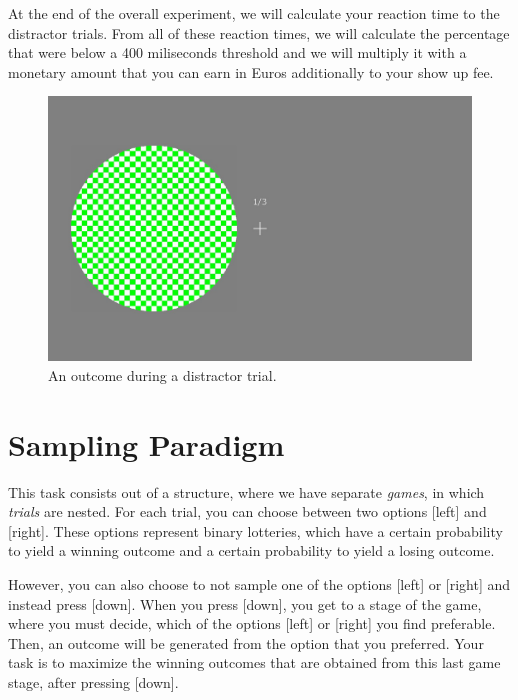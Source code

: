\documentclass[12pt, oneside]{scrartcl}
\begin{document}
At the end of the overall experiment, we will calculate your reaction time to the distractor trials. From all of these reaction times, we will calculate the percentage that were below a 400 miliseconds threshold and we will multiply it with a monetary amount that you can earn in Euros additionally to your show up fee. \vspace{\baselineskip}


\begin{figure}[h!]
\begin{center}
\includegraphics[scale=0.2]{distrLeft.jpg}
\caption{An outcome during a distractor trial.}
\label{distrLeft}
\end{center}
\end{figure}



\pagebreak
\section{Sampling Paradigm}

This task consists out of a structure, where we have separate \textit{games}, in which \textit{trials} are nested. For each trial, you can choose between two options [left] and [right]. These options represent binary lotteries, which have a certain probability to yield a winning outcome and a certain probability to yield a losing outcome. \vspace{\baselineskip}

However, you can also choose to not sample one of the options [left] or [right] and instead press [down]. When you press [down], you get to a stage of the game, where you must decide, which of the options [left] or [right] you find preferable. Then, an outcome will be generated from the option that you preferred. Your task is to maximize the winning outcomes that are obtained from this last game stage, after pressing [down]. \vspace{\baselineskip}
\end{document}
